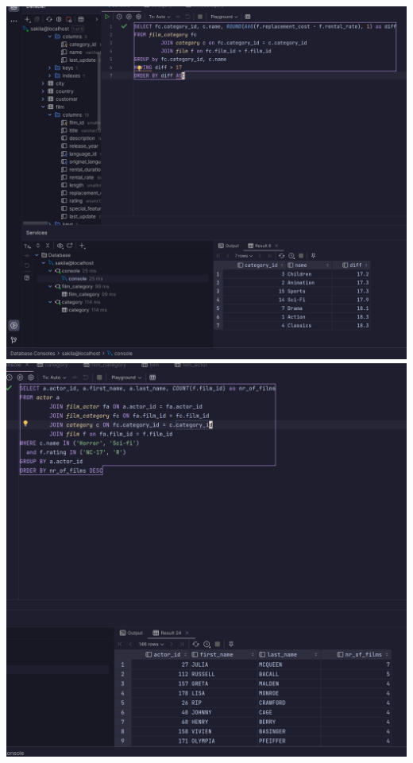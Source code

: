 \documentclass{exam}
\begin{document}
\begin{questions}
	\includegraphics[width=\textwidth,height=\textheight,keepaspectratio]{question5}
	\question
	\includegraphics[width=\textwidth,height=\textheight,keepaspectratio]{question6}
	\question

\end{questions}
\end{document}
